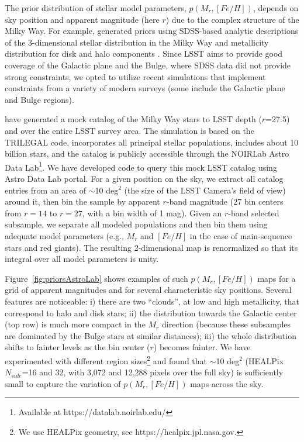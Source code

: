 The prior distribution of stellar model parameters, $p(M_r, [Fe/H])$, depends on sky position and apparent
magnitude (here $r$) due to the complex structure of the Milky Way. For example,  \cite{2014ApJ...783..114G}
generated priors using SDSS-based analytic descriptions of the 3-dimensional stellar distribution in the Milky Way
\citep{2008ApJ...673..864J} and metallicity distribution for disk and halo components \citep{2008ApJ...684..287I}. 
Since LSST aims to provide good coverage of the Galactic plane and the Bulge, where SDSS data did not provide strong
constraints, we opted to utilize recent simulations that implement constraints from a variety of modern surveys (some
include the Galactic plane and Bulge regions). 

\cite{dal_tio_simulating_2022} have generated a mock catalog of the Milky Way stars to LSST depth ($r$=27.5) and over
the entire LSST survey area. The simulation is based on the TRILEGAL code, incorporates all principal stellar populations,
includes about 10 billion stars, and the catalog is publicly accessible through the NOIRLab Astro Data
Lab\footnote{Available at https://datalab.noirlab.edu/}.
We have developed code to query this mock LSST catalog using Astro Data Lab portal. For a given position on the sky, we
extract all catalog entries from an area of $\sim$10 deg$^2$ (the size of the LSST Camera's field of view) around it, then bin
the sample by apparent $r$-band magnitude (27 bin centers from $r=14$ to $r=27$, with a bin width of 1 mag). 
Given an $r$-band selected subsample, we separate all modeled populations and then bin them using adequate model
parameters (e.g., $M_r$ and $[Fe/H]$ in the case of main-sequence stars and red giants). The resulting 2-dimensional map
is renormalized so that its integral over all model parameters is unity.

Figure~\ref{fig:priorsAstroLab} shows examples of such $p(M_r, [Fe/H])$ maps for a grid of apparent magnitudes and for
several characteristic sky positions. Several features are noticeable: i) there are two ``clouds'', at low and high metallicity,
that correspond to halo and disk stars; ii) the distribution towards the Galactic center (top row) is much more compact in
the $M_r$ direction (because these subsamples are dominated by the Bulge stars at similar distances); iii) the whole 
distribution shifts to fainter levels as the bin center ($r$) becomes fainter. We have experimented with different region
sizes\footnote{We use HEALPix geometry, see https://healpix.jpl.nasa.gov.} and found that $\sim$10 deg$^2$
(HEALPix $N_{side}$=16 and 32, with 3,072 and 12,288 pixels over the full sky) is sufficiently small to capture the
variation of $p(M_r, [Fe/H])$ maps across the sky.
 
